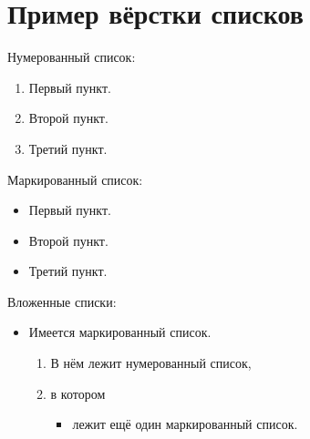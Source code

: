 \section{Пример вёрстки списков} \label{sect2_3}

\noindent Нумерованный список:
\begin{enumerate}
  \item Первый пункт.
  \item Второй пункт.
  \item Третий пункт.
\end{enumerate}

\noindent Маркированный список:
\begin{itemize}
  \item Первый пункт.
  \item Второй пункт.
  \item Третий пункт.
\end{itemize}

\noindent Вложенные списки:
\begin{itemize}
  \item Имеется маркированный список.
  \begin{enumerate}
    \item В нём лежит нумерованный список,
    \item в котором
    \begin{itemize}
      \item лежит ещё один маркированный список.
    \end{itemize}    
  \end{enumerate}
\end{itemize}

